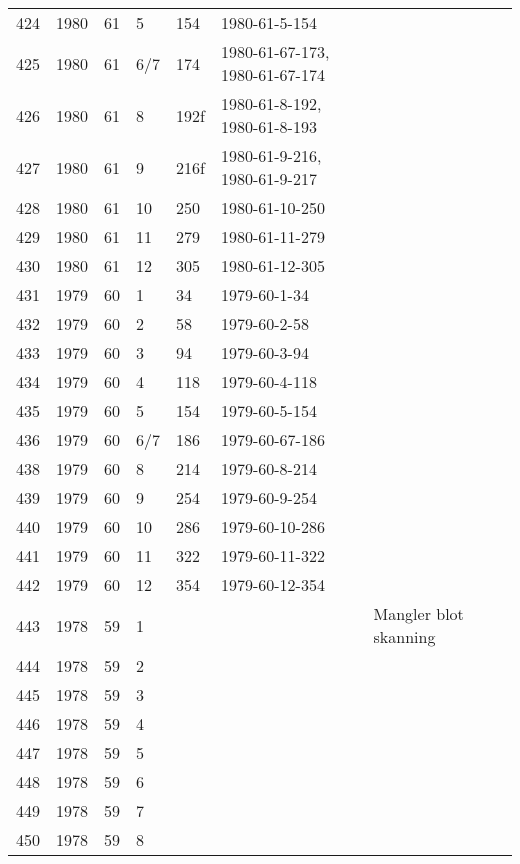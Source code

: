 \begin{longtable}{ |l|l|l|l|l|l|l|l| }
424 & 1980 & 61 &     5 &     154 & 1980-61-5-154  &  & \\
425 & 1980 & 61 &   6/7 &     174 & 1980-61-67-173, 1980-61-67-174 &  & \\
426 & 1980 & 61 &     8 &    192f & 1980-61-8-192, 1980-61-8-193 &  & \\
427 & 1980 & 61 &     9 &    216f & 1980-61-9-216, 1980-61-9-217 &  & \\
428 & 1980 & 61 &    10 &     250 & 1980-61-10-250 &  & \\
429 & 1980 & 61 &    11 &     279 & 1980-61-11-279 &  & \\
430 & 1980 & 61 &    12 &     305 & 1980-61-12-305 &  & \\
431 & 1979 & 60 &     1 &      34 & 1979-60-1-34   &  & \\
432 & 1979 & 60 &     2 &      58 & 1979-60-2-58   &  & \\
433 & 1979 & 60 &     3 &      94 & 1979-60-3-94   &  & \\
434 & 1979 & 60 &     4 &     118 & 1979-60-4-118  &  & \\
435 & 1979 & 60 &     5 &     154 & 1979-60-5-154  &  & \\
436 & 1979 & 60 &   6/7 &     186 & 1979-60-67-186 &  & \\
438 & 1979 & 60 &     8 &     214 & 1979-60-8-214  &  & \\
439 & 1979 & 60 &     9 &     254 & 1979-60-9-254  &  & \\
440 & 1979 & 60 &    10 &     286 & 1979-60-10-286 &  & \\
441 & 1979 & 60 &    11 &     322 & 1979-60-11-322 &  & \\
442 & 1979 & 60 &    12 &     354 & 1979-60-12-354 &  & \\
443 & 1978 & 59 &     1 &         &                & Mangler blot skanning & \\
444 & 1978 & 59 &     2 &         &                &  & \\
445 & 1978 & 59 &     3 &         &                &  & \\
446 & 1978 & 59 &     4 &         &                &  & \\
447 & 1978 & 59 &     5 &         &                &  & \\
448 & 1978 & 59 &     6 &         &                &  & \\
449 & 1978 & 59 &     7 &         &                &  & \\
450 & 1978 & 59 &     8 &         &                &  & \\

\end{longtable}

